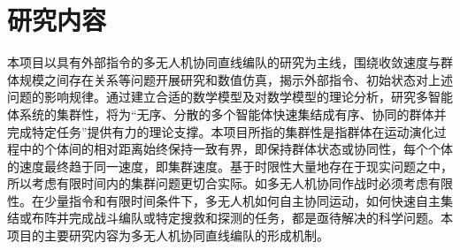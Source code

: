 
\section{研究内容}

本项目以具有外部指令的多无人机协同直线编队的研究为主线，围绕收敛速度与群体规模之间存在关系等问题开展研究和数值仿真，揭示外部指令、初始状态对上述问题的影响规律。通过建立合适的数学模型及对数学模型的理论分析，研究多智能体系统的集群性，将为“无序、分散的多个智能体快速集结成有序、协同的群体并完成特定任务”提供有力的理论支撑。本项目所指的集群性是指群体在运动演化过程中的个体间的相对距离始终保持一致有界，即保持群体状态或协同性，每个个体的速度最终趋于同一速度，即集群速度。基于时限性大量地存在于现实问题之中，所以考虑有限时间内的集群问题更切合实际。如多无人机协同作战时必须考虑有限性。在少量指令和有限时间条件下，多无人机如何自主协同运动，如何快速自主集结或布阵并完成战斗编队或特定搜救和探测的任务，都是亟待解决的科学问题。本项目的主要研究内容为多无人机协同直线编队的形成机制。